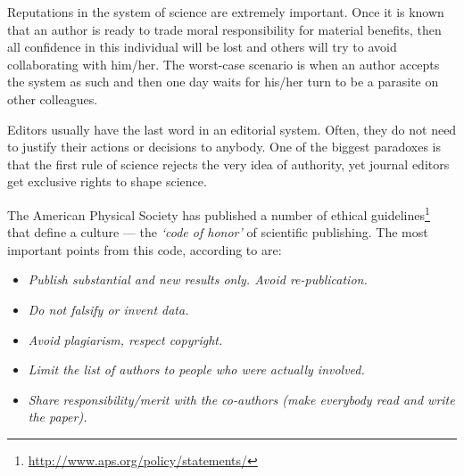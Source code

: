 \documentclass[graybox,envcountchap,sectrefs,UStrade]{svmono}
\begin{document}
Reputations in the system of science are extremely important. Once it is known that an author is ready to trade moral responsibility for material benefits, then all confidence in this individual will be lost and others will try to avoid collaborating with him/her. The worst-case scenario is when an author accepts the system as such and then one day waits for his/her turn to be a parasite on other colleagues.\par

\begin{center}
\end{center}

Editors usually have the last word in an editorial system. Often, they do not need to justify their actions or decisions to anybody. One of the biggest paradoxes is that the first rule of science rejects the very idea of authority, yet journal editors get exclusive rights to shape science.\par

The American Physical Society has published a number of ethical guidelines\footnote{\url{http://www.aps.org/policy/statements/}} that define a culture --- the \emph{`code of honor'} of scientific publishing. The most important points from this code, according to \citet[p.129-32]{AscheronKickuth2004} are:

\begin{itemize}\renewcommand{\labelitemi}{$\checkmark$}
  \item \emph{Publish substantial and new results only. Avoid re-publication.}
  \item \emph{Do not falsify or invent data.}
  \item \emph{Avoid plagiarism, respect copyright.}
  \item \emph{Limit the list of authors to people who were actually involved.}
  \item \emph{Share responsibility/merit with the co-authors (make everybody read and write the paper).}
\end{itemize}
\end{document}

